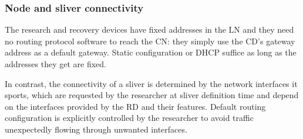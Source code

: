 \documentclass[conference]{IEEEtran}
\begin{document}

\subsubsection{Node and sliver connectivity}
\label{sec:connectivity}

The research and recovery devices have fixed addresses in the LN and they need
no routing protocol software to reach the CN: they simply use the CD's gateway
address as a default gateway.  Static configuration or DHCP suffice as long as
the addresses they get are fixed.

In contrast, the connectivity of a sliver is determined by the network
interfaces it sports, which are requested by the researcher at sliver
definition time and depend on the interfaces provided by the RD and their
features.  Default routing configuration is explicitly controlled by the
researcher to avoid traffic unexpectedly flowing through unwanted interfaces.
\end{document}
